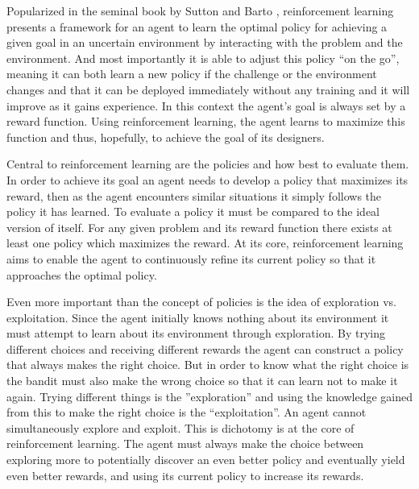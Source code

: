 Popularized in the seminal book by Sutton and Barto \cite{sutton_barto}, reinforcement learning presents a framework for an agent to learn the optimal policy for achieving a given goal in an uncertain environment by interacting with the problem and the environment. And most importantly it is able to adjust this policy ``on the go'', meaning it can both learn a new policy if the challenge or the environment changes and that it can be deployed immediately without any training and it will improve as it gains experience. In this context the agent's goal is always set by a reward function. Using reinforcement learning, the agent learns to maximize this function and thus, hopefully, to achieve the goal of its designers. 

Central to reinforcement learning are the policies and how best to evaluate them. In order to achieve its goal an agent needs to develop a policy that maximizes its reward, then as the agent encounters similar situations it simply follows the policy it has learned. To evaluate a policy it must be compared to the ideal version of itself. For any given problem and its reward function there exists at least one policy which maximizes the reward. At its core, reinforcement learning aims to enable the agent to continuously refine its current policy so that it approaches the optimal policy. 

Even more important than the concept of policies is the idea of exploration vs. exploitation. Since the agent initially knows nothing about its environment it must attempt  to learn about its environment through exploration. By trying different choices and receiving different rewards the agent can construct a policy that always makes the right choice. But in order to know what the right choice is the bandit must also make the wrong choice so that it can learn not to make it again. Trying different things is the ''exploration'' and using the knowledge gained from this to make the right choice is the ``exploitation''. An agent cannot simultaneously explore and exploit. This is dichotomy is at the core of reinforcement learning. The agent must always make the choice between exploring more to potentially discover an even better policy and eventually yield even better rewards, and using its current policy to increase its rewards. 

